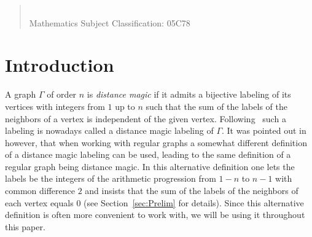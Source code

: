 \documentclass[11 pt,english]{article}
\newcommand{\G}{\Gamma}
\theoremstyle{definition}
\begin{document}
\begin{quotation}
\\
	{\small Mathematics Subject Classification: 05C78}
\end{quotation}



\section{Introduction}
\label{sec:Intro}

A graph $\G$ of order $n$ is {\em distance magic} if it admits a bijective labeling of its vertices with integers from $1$ up to $n$ such that the sum of the labels of the neighbors of a vertex is independent of the given vertex. Following~\cite{SugFroMilRyaWal09} such a labeling is nowadays called a distance magic labeling of $\G$. It was pointed out in~\cite{MikSpa21} however, that when working with regular graphs a somewhat different definition of a distance magic labeling can be used, leading to the same definition of a regular graph being distance magic. In this alternative definition one lets the labels be the integers of the arithmetic progression from $1-n$ to $n-1$ with common difference $2$ and insists that the sum of the labels of the neighbors of each vertex equals $0$ (see Section~\ref{sec:Prelim} for details). Since this alternative definition is often more convenient to work with, we will be using it throughout this paper. 
\end{document}
